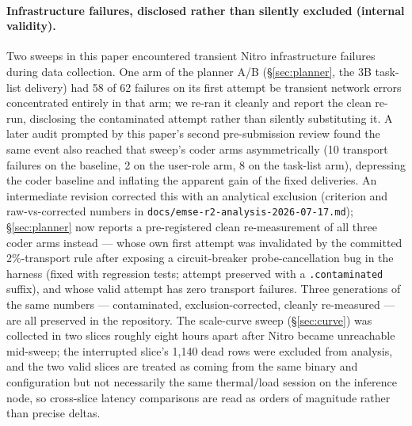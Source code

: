 \documentclass[smallcondensed,natbib]{svjour3}
\begin{document}
\paragraph{Infrastructure failures, disclosed rather than silently
excluded (internal validity).} Two sweeps in this paper encountered transient Nitro
infrastructure failures during data collection. One arm of the planner
A/B (\S\ref{sec:planner}, the 3B task-list delivery) had 58 of 62
failures on its first attempt be transient network errors concentrated
entirely in that arm; we re-ran it cleanly and report the clean re-run,
disclosing the contaminated attempt rather than silently substituting
it. A later audit prompted by this paper's second pre-submission
review found the same event also reached that sweep's coder arms
asymmetrically (10 transport failures on the baseline, 2 on the
user-role arm, 8 on the task-list arm), depressing the coder baseline
and inflating the apparent gain of the fixed deliveries. An
intermediate revision corrected this with an analytical exclusion
(criterion and raw-vs-corrected numbers in
\texttt{docs/emse-r2-analysis-2026-07-17.md}); \S\ref{sec:planner}
now reports a pre-registered clean re-measurement of all three coder
arms instead --- whose own first attempt was invalidated by the
committed 2\%-transport rule after exposing a circuit-breaker
probe-cancellation bug in the harness (fixed with regression tests;
attempt preserved with a \texttt{.contaminated} suffix), and whose
valid attempt has zero transport failures. Three generations of the
same numbers --- contaminated, exclusion-corrected, cleanly
re-measured --- are all preserved in the repository. The scale-curve sweep (\S\ref{sec:curve}) was collected in two
slices roughly eight hours apart after Nitro became unreachable
mid-sweep; the interrupted slice's 1{,}140 dead rows were excluded from
analysis, and the two valid slices are treated as coming from the same
binary and configuration but not necessarily the same thermal/load
session on the inference node, so cross-slice latency comparisons are
read as orders of magnitude rather than precise deltas.
\end{document}
